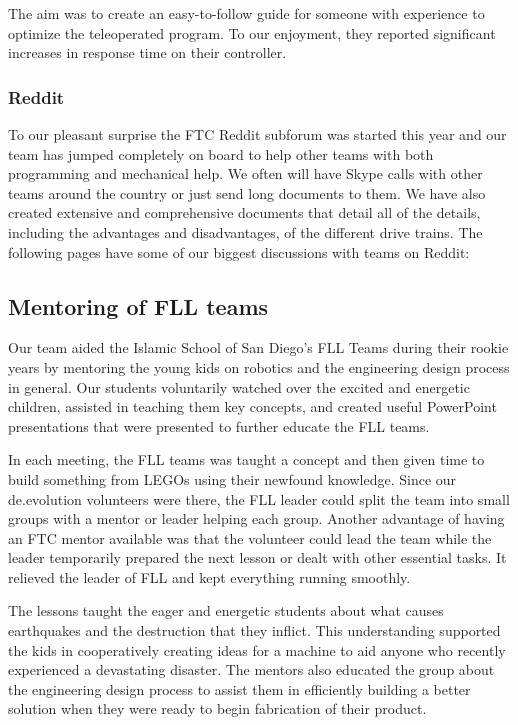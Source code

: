 

The aim was to create an easy-to-follow guide for someone with experience to optimize the teleoperated program. To our enjoyment, they reported significant increases in response time on their controller.

\subsubsection{Reddit}
To our pleasant surprise the FTC Reddit subforum was started this year and our team has jumped completely on board to help other teams with both programming and mechanical help. We often will have Skype calls with other teams around the country or just send long documents to them. We have also created extensive and comprehensive documents that detail all of the details, including the advantages and disadvantages, of the different drive trains. The following pages have some of our biggest discussions with teams on Reddit:



\subsection{Mentoring of FLL teams}
Our team aided the Islamic School of San Diego's FLL Teams during their rookie years by mentoring the young kids on robotics and the engineering design process in general. Our students voluntarily watched over the excited and energetic children, assisted in teaching them key concepts, and created useful PowerPoint presentations that were presented to further educate the FLL teams.

In each meeting, the FLL teams was taught a concept and then given time to build something from LEGOs using their newfound knowledge. Since our de.evolution volunteers were there, the FLL leader could split the team into small groups with a mentor or leader helping each group. Another advantage of having an FTC mentor available was that the volunteer could lead the team while the leader temporarily prepared the next lesson or dealt with other essential tasks. It relieved the leader of FLL and kept everything running smoothly.

The lessons taught the eager and energetic students about what causes earthquakes and the destruction that they inflict. This understanding supported the kids in cooperatively creating ideas for a machine to aid anyone who recently experienced a devastating disaster. The mentors also educated the group about the engineering design process to assist them in efficiently building a better solution when they were ready to begin fabrication of their product.

